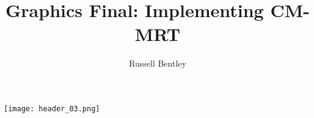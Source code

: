 \documentclass[10pt]{article}
\title{Graphics Final: Implementing CM-MRT}
\author{Russell Bentley}
\begin{document}
\maketitle

\tableofcontents

\begin{center}
  \texttt{[image: header\_03.png]}
\end{center}

\twocolumn











\printbibliography
\end{document}
